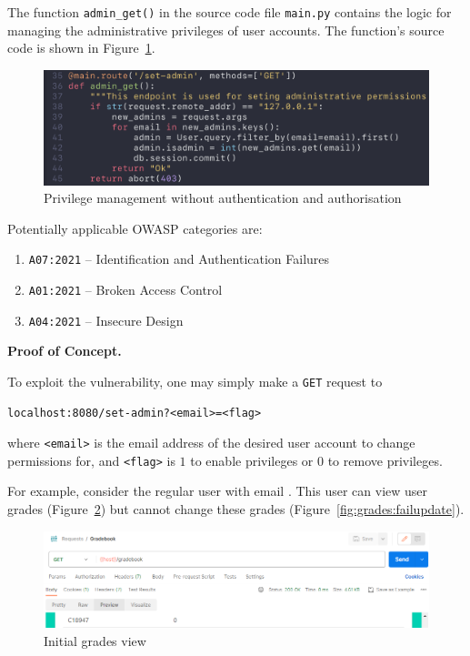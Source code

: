 \documentclass[parskip=half]{scrartcl}
\newcommand{\figref}[1]{Figure~\ref{#1}}
\begin{document}
The function \texttt{admin\_get()} in the source code file \texttt{main.py}
contains the logic for managing the administrative privileges of user accounts.
The function's source code is shown in \figref{fig:code:adminset}.

\begin{figure}[h]
    \centering
    \includegraphics[width=\textwidth]{code_adminset}
    \caption{Privilege management without authentication and authorisation}
    \label{fig:code:adminset}
\end{figure}

Potentially applicable OWASP categories are:
\begin{enumerate}
  \item \texttt{A07:2021} -- Identification and Authentication Failures%
  \item \texttt{A01:2021} -- Broken Access Control%
  \item \texttt{A04:2021} -- Insecure Design%
\end{enumerate}

\textbf{Proof of Concept.}

To exploit the vulnerability, one may simply make a \texttt{GET} request to
\begin{verbatim}
localhost:8080/set-admin?<email>=<flag>
\end{verbatim}
where \texttt{<email>} is the email address of the desired user account to
change permissions for, and \texttt{<flag>} is $1$ to enable privileges or $0$
to remove privileges.

For example, consider the regular user with email \texttt{\email}. This user
can view user grades (\figref{fig:grades:view}) but cannot change these
grades (\figref{fig:grades:failupdate}).

\begin{figure}[h]
    \centering
    \includegraphics[width=\textwidth]{view_grade}
    \caption{Initial grades view}
    \label{fig:grades:view}
\end{figure}
\end{document}
